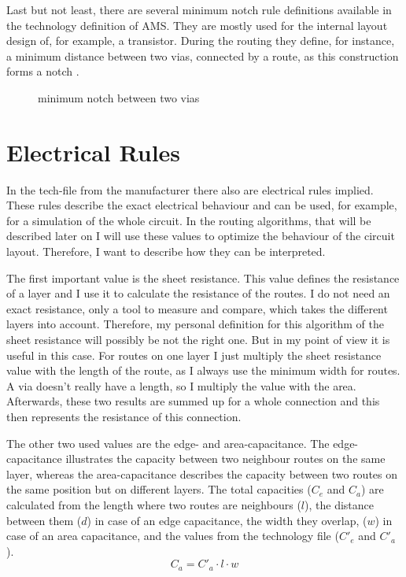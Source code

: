Last but not least, there are several minimum notch rule definitions available in the technology definition of AMS. They are mostly used for the internal layout design of, for example, a transistor. During the routing they define, for instance, a minimum distance between two vias, connected by a route, as this construction forms a notch .

\begin{figure}
	\centering
	
	\caption{minimum notch between two vias}
	\label{fig:technology_rule_notch}
\end{figure}

\section{Electrical Rules}
\label{sec:electrical_rules}
In the tech-file from the manufacturer there also are electrical rules implied. These rules describe the exact electrical behaviour and can be used, for example, for a simulation of the whole circuit. In the routing algorithms, that will be described later on  I will use these values to optimize the behaviour of the circuit layout. Therefore, I want to describe how they can be interpreted.

The first important value is the sheet resistance. This value defines the resistance of a layer and I use it to calculate the resistance of the routes. I do not need an exact resistance, only a tool to measure and compare, which takes the different layers into account. Therefore, my personal definition for this algorithm of the sheet resistance will possibly be not the right one. But in my point of view it is useful in this case. For routes on one layer I just multiply the sheet resistance value with the length of the route, as I always use the minimum width for routes. A via doesn't really have a length, so I multiply the value with the area. Afterwards, these two results are summed up for a whole connection and this then represents the resistance of this connection.

The other two used values are the edge- and area-capacitance. The edge-capacitance illustrates the capacity between two neighbour routes on the same layer, whereas the area-capacitance describes the capacity between two routes on the same position but on different layers. The total capacities ($C_e$ and $C_a$) are calculated from the length where two routes are neighbours ($l$), the distance between them ($d$) in case of an edge capacitance, the width they overlap, ($w$) in case of an area capacitance, and the values from the technology file ($C'_e$ and $C'_a$).
\begin{equation}
	\label{eq:area_capacitance}
	C_a = C'_a \cdot l \cdot w
\end{equation}


